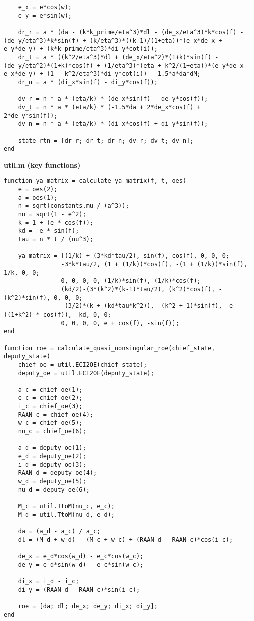 \begin{lstlisting}
    e_x = e*cos(w);
    e_y = e*sin(w);

    dr_r = a * (da - (k*k_prime/eta^3)*dl - (de_x/eta^3)*k*cos(f) - (de_y/eta^3)*k*sin(f) + (k/eta^3)*((k-1)/(1+eta))*(e_x*de_x + e_y*de_y) + (k*k_prime/eta^3)*di_y*cot(i));
    dr_t = a * ((k^2/eta^3)*dl + (de_x/eta^2)*(1+k)*sin(f) - (de_y/eta^2)*(1+k)*cos(f) + (1/eta^3)*(eta + k^2/(1+eta))*(e_y*de_x - e_x*de_y) + (1 - k^2/eta^3)*di_y*cot(i)) - 1.5*a*da*dM;
    dr_n = a * (di_x*sin(f) - di_y*cos(f));

    dv_r = n * a * (eta/k) * (de_x*sin(f) - de_y*cos(f));
    dv_t = n * a * (eta/k) * (-1.5*da + 2*de_x*cos(f) + 2*de_y*sin(f));
    dv_n = n * a * (eta/k) * (di_x*cos(f) + di_y*sin(f));
    
    state_rtn = [dr_r; dr_t; dr_n; dv_r; dv_t; dv_n];
end
\end{lstlisting}

\textbf{util.m (key functions)}
\begin{lstlisting}
function ya_matrix = calculate_ya_matrix(f, t, oes)
    e = oes(2);
    a = oes(1);
    n = sqrt(constants.mu / (a^3));
    nu = sqrt(1 - e^2);
    k = 1 + (e * cos(f));
    kd = -e * sin(f);
    tau = n * t / (nu^3);

    ya_matrix = [(1/k) + (3*kd*tau/2), sin(f), cos(f), 0, 0, 0;
                -3*k*tau/2, (1 + (1/k))*cos(f), -(1 + (1/k))*sin(f), 1/k, 0, 0;
                0, 0, 0, 0, (1/k)*sin(f), (1/k)*cos(f);
                (kd/2)-(3*(k^2)*(k-1)*tau/2), (k^2)*cos(f), -(k^2)*sin(f), 0, 0, 0;
                -(3/2)*(k + (kd*tau*k^2)), -(k^2 + 1)*sin(f), -e-((1+k^2) * cos(f)), -kd, 0, 0;
                0, 0, 0, 0, e + cos(f), -sin(f)];
end

function roe = calculate_quasi_nonsingular_roe(chief_state, deputy_state)
    chief_oe = util.ECI2OE(chief_state);
    deputy_oe = util.ECI2OE(deputy_state);

    a_c = chief_oe(1);
    e_c = chief_oe(2);
    i_c = chief_oe(3);
    RAAN_c = chief_oe(4);
    w_c = chief_oe(5);
    nu_c = chief_oe(6);
    
    a_d = deputy_oe(1);
    e_d = deputy_oe(2);
    i_d = deputy_oe(3);
    RAAN_d = deputy_oe(4);
    w_d = deputy_oe(5);
    nu_d = deputy_oe(6);

    M_c = util.TtoM(nu_c, e_c);
    M_d = util.TtoM(nu_d, e_d);
    
    da = (a_d - a_c) / a_c;
    dl = (M_d + w_d) - (M_c + w_c) + (RAAN_d - RAAN_c)*cos(i_c);

    de_x = e_d*cos(w_d) - e_c*cos(w_c);
    de_y = e_d*sin(w_d) - e_c*sin(w_c);
    
    di_x = i_d - i_c;
    di_y = (RAAN_d - RAAN_c)*sin(i_c);
    
    roe = [da; dl; de_x; de_y; di_x; di_y];
end
\end{lstlisting}

